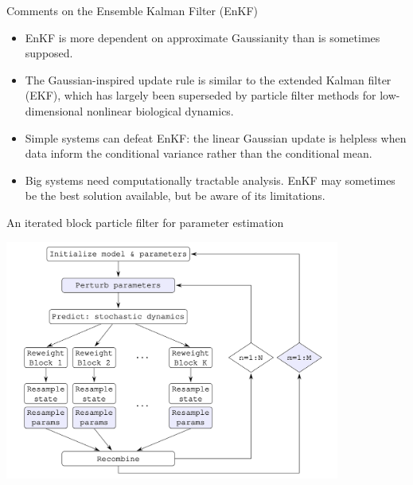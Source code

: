 \documentclass{beamer}
\begin{document}
\begin{frame}{Comments on the Ensemble Kalman Filter (EnKF)}

  \begin{itemize}
  \item EnKF is more dependent on approximate Gaussianity than is sometimes supposed.

    \vspace{2mm}
    
  \item The Gaussian-inspired update rule is similar to the extended Kalman filter (EKF), which has largely been superseded by particle filter methods for low-dimensional nonlinear biological dynamics.

    \vspace{2mm}
    
\item Simple systems can defeat EnKF: the linear Gaussian update is helpless when data inform the conditional variance rather than the conditional mean.

  \vspace{2mm}
  
    \item Big systems need computationally tractable analysis. EnKF may sometimes be the best solution available, but be aware of its limitations.

  \end{itemize}

\end{frame}


\begin{frame}{An iterated block particle filter for parameter estimation}


  \begin{center}
    
  \includegraphics[width=11cm]{ibpf.png}


  \end{center}
  
\end{frame}
\end{document}

